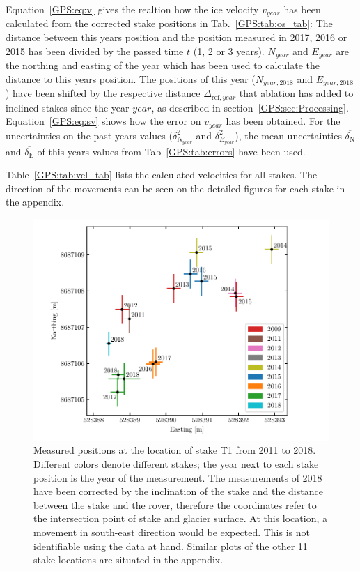 Equation~\ref{GPS:eq:v} gives the realtion how the ice velocity $v_{year}$ has been calculated from the corrected stake positions in
Tab.~\ref{GPS:tab:os_tab}:
The distance between this years position and the position measured in 2017, 2016 or 2015 has been divided
by the passed time $t$ (1, 2 or 3 years).
$N_{year}$ and $E_{year}$ are the northing and easting of the year which has been used to calculate the distance to
this years position.
The positions of this year ($N_{year, 2018}$ and $E_{year, 2018}$) have been shifted by the respective distance
$\Delta_{\text{ref}, year}$ that ablation has
added to inclined stakes since the year $year$, as described in section~\ref{GPS:sec:Processing}.
Equation~\ref{GPS:eq:sv} shows how the error on $v_{year}$ has been obtained.
For the uncertainties on the past years values ($\delta_{N_{year}}^2$ and $\delta_{E_{year}}^2$),
the mean uncertainties $\overline{\delta_{\text{N}}}$ and $\overline{\delta_{\text{E}}}$ of this years values
from Tab~\ref{GPS:tab:errors} have been used.

Table~\ref{GPS:tab:vel_tab} lists the calculated velocities for all stakes.
The direction of the movements can be seen on the detailed figures for each stake in the appendix.


\begin{figure}[H]
    \centering
    \includegraphics[width=\textwidth]{./figs/T1_2d.pdf}
    \caption{Measured positions at the location of stake T1 from 2011 to 2018.
    Different colors denote different stakes;
  	the year next to each stake position is the year of the measurement.
  	The measurements of 2018 have been corrected by the inclination of the stake and
  	the distance between the stake and the rover, therefore the coordinates refer to the intersection point
  	of stake and glacier surface.
    	At this location, a movement in south-east direction would be expected.
    	This is not identifiable using the data at hand.
 	Similar plots of the other 11 stake locations are situated in the appendix.}
    \label{GPS:fig:T1_2d}
\end{figure}


